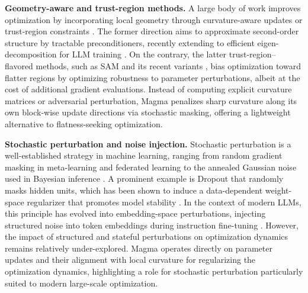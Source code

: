 \documentclass[11pt, a4paper, twocolumn, copyright, goog]{google}
\theoremstyle{plain}
\theoremstyle{definition}
\theoremstyle{remark}
\begin{document}
\textbf{Geometry-aware and trust-region methods.}
A large body of work improves optimization by incorporating local geometry through curvature-aware updates \citep{dauphin2014identifying, martens2015optimizing, gupta2018shampoo,  yao2021adaHessian} or trust-region constraints \citep{foret2020sharpness,kwon2021asam}. 
The former direction aims to approximate second-order structure by tractable preconditioners, recently extending to efficient eigen-decomposition for LLM training \citep{vyas2024soap}. 
On the contrary, the latter trust-region–flavored methods, such as SAM and its recent variants \citep{mueller2023normalization,li2024friendly}, bias optimization toward flatter regions by optimizing robustness to parameter perturbations, albeit at the cost of additional gradient evaluations. 
Instead of computing explicit curvature matrices or adversarial perturbation, Magma penalizes sharp curvature along its own block-wise update directions via stochastic masking, offering a lightweight alternative to flatness-seeking optimization.



\textbf{Stochastic perturbation and noise injection.}
Stochastic perturbation is a well-established strategy in machine learning, ranging from random gradient masking in meta-learning \citep{tseng2020regularizing} and federated learning \citep{wei2020framework} to the annealed Gaussian noise used in Bayesian inference \citep{welling2011bayesian, neelakantan2015adding}. 
A prominent example is Dropout \citep{srivastava2014dropout} that randomly masks hidden units, which has been shown to induce a data-dependent weight-space regularizer that promotes model stability  \citep{mianjy2018implicit,wei2020implicit,zhang2024implicit}.
In the context of modern LLMs, this principle has evolved into embedding-space perturbations, injecting structured noise into token embeddings during instruction fine-tuning \citep{jain2024neftune}. 
However, the impact of structured and stateful perturbations on optimization dynamics remains relatively under-explored. 
Magma operates directly on parameter updates and their alignment with local curvature for regularizing the optimization dynamics, highlighting a role for stochastic perturbation particularly suited to modern large-scale optimization.





\end{document}
